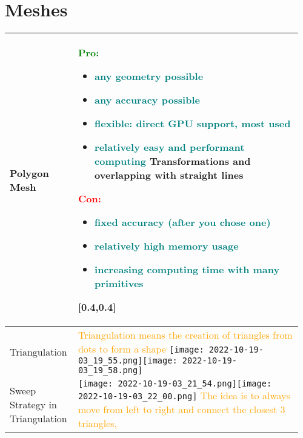 \documentclass[main.tex,fontsize=8pt,paper=a4,paper=portrait,DIV=calc,]{scrartcl}
\begin{document}
\begin{table}[ht!]
\section{Meshes}
\begin{tabular}{|m{0.2\linewidth}|m{0.755\linewidth}|}
\hline
Polygon Mesh & \minipg{
\textcolor{green}{Pro:}\newline
\begin{itemize}
  \item \textcolor{teal}{any geometry possible}
  \item \textcolor{teal}{any accuracy possible}
  \item \textcolor{teal}{flexible: direct GPU support, most used}
  \item \textcolor{teal}{relatively easy and performant computing}\newline
    Transformations and overlapping with straight lines
\end{itemize}
}
{
\textcolor{red}{Con:}\newline
\begin{itemize}
  \item \textcolor{teal}{fixed accuracy (after you chose one)}
  \item \textcolor{teal}{relatively high memory usage}
  \item \textcolor{teal}{increasing computing time with many primitives}\newline 
  \, \newline
  \, \newline
  \, \newline
  \vspace{-3mm}
\end{itemize}
}[0.4,0.4]\\
\hline
Triangulation & 
\textcolor{orange}{Triangulation means the creation of triangles from dots to form a shape}\newline
\texttt{[image: 2022-10-19-03\_19\_55.png]}\texttt{[image: 2022-10-19-03\_19\_58.png]}\\
\hline
Sweep Strategy \newline in Triangulation & 
\vspace{2mm}
\texttt{[image: 2022-10-19-03\_21\_54.png]}\texttt{[image: 2022-10-19-03\_22\_00.png]}\newline
\textcolor{orange}{The idea is to always move from left to right and connect the closest 3 triangles,\newline
}
\end{tabular}
\end{table}
\end{document}
